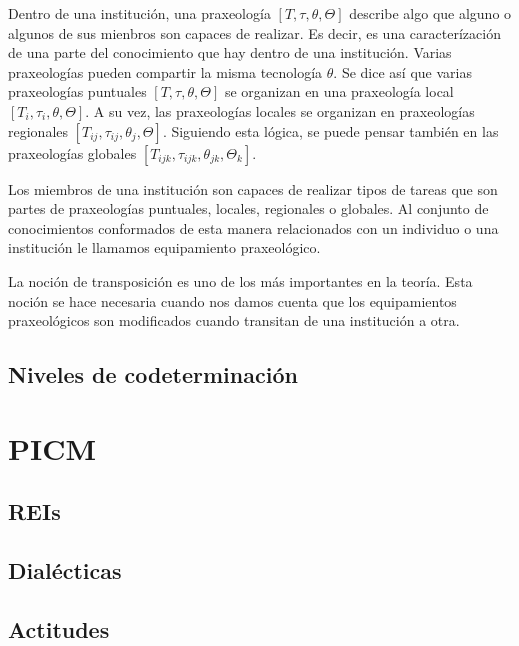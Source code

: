 \documentclass[12pt,spanish,]{book}
\begin{document}
Dentro de una institución, una praxeología \([T,\tau,\theta,\Theta]\) describe algo que alguno o algunos de sus mienbros son capaces de realizar.
Es decir, es una caracterízación de una parte del conocimiento que hay dentro de una institución. Varias praxeologías pueden compartir la misma tecnología \(\theta\).
Se dice así que varias praxeologías puntuales \([T,\tau,\theta,\Theta]\) se organizan en una praxeología local \([T_i,\tau_i,\theta,\Theta]\).
A su vez, las praxeologías locales se organizan en praxeologías regionales \([T_{ij},\tau_{ij},\theta_j,\Theta]\).
Siguiendo esta lógica, se puede pensar también en las praxeologías globales \([T_{ijk},\tau_{ijk},\theta_{jk},\Theta_k]\).

Los miembros de una institución son capaces de realizar tipos de tareas que son partes de praxeologías puntuales, locales, regionales o globales. Al conjunto de conocimientos conformados de esta manera relacionados con un individuo o una institución le llamamos equipamiento praxeológico.

La noción de transposición es uno de los más importantes en la teoría. Esta noción se hace necesaria cuando nos damos cuenta que los equipamientos praxeológicos son modificados cuando transitan de una institución a otra.

\hypertarget{niveles-de-codeterminaciuxf3n}{%
\subsection{Niveles de codeterminación}\label{niveles-de-codeterminaciuxf3n}}

\hypertarget{picm}{%
\section{PICM}\label{picm}}

\hypertarget{reis}{%
\subsection{REIs}\label{reis}}

\hypertarget{dialuxe9cticas}{%
\subsection{Dialécticas}\label{dialuxe9cticas}}

\hypertarget{actitudes}{%
\subsection{Actitudes}\label{actitudes}}
\end{document}
